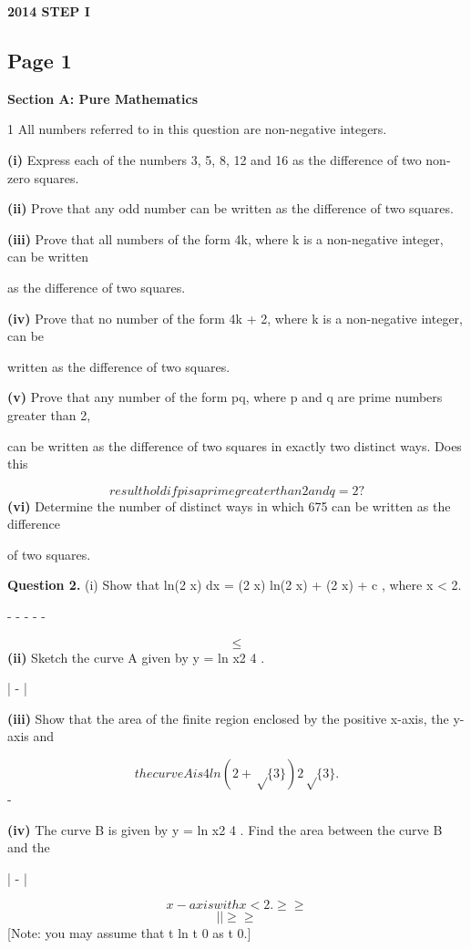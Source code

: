 \documentclass[12pt]{article}
\begin{document}
\begin{center}
{\Large \textbf{2014 STEP I}}
\end{center}

\subsection*{Page 1}
\begin{flushleft}
\bigskip\textbf{Section A: Pure Mathematics}\par
1 All numbers referred to in this question are non-negative integers.\par
\textbf{(i)} Express each of the numbers 3, 5, 8, 12 and 16 as the difference of two non-zero squares.\par
\textbf{(ii)} Prove that any odd number can be written as the difference of two squares.\par
\textbf{(iii)} Prove that all numbers of the form 4k, where k is a non-negative integer, can be written\par
as the difference of two squares.\par
\textbf{(iv)} Prove that no number of the form 4k + 2, where k is a non-negative integer, can be\par
written as the difference of two squares.\par
\textbf{(v)} Prove that any number of the form pq, where p and q are prime numbers greater than 2,\par
can be written as the difference of two squares in exactly two distinct ways. Does this\par
\[result hold if p is a prime greater than 2 and q = 2?\]
\textbf{(vi)} Determine the number of distinct ways in which 675 can be written as the difference\par
of two squares.\par
\bigskip\textbf{Question 2.} (i) Show that ln(2 x) dx = (2 x) ln(2 x) + (2 x) + c , where x < 2.\par
- - - - -\par
\[\leq\]
\textbf{(ii)} Sketch the curve A given by y = ln x2 4 .\par
| - |\par
\textbf{(iii)} Show that the area of the finite region enclosed by the positive x-axis, the y-axis and\par
\[the curve A is 4 ln(2 + \sqrt\{3\}) 2\sqrt\{3\} .\]
-\par
\textbf{(iv)} The curve B is given by y = ln x2 4 . Find the area between the curve B and the\par
| - |\par
\[x-axis with x < 2. \geq \geq\]
\[| | \geq \geq\]
[Note: you may assume that t ln t 0 as t 0.]\par
\to \to\par
\end{flushleft}
\end{document}
